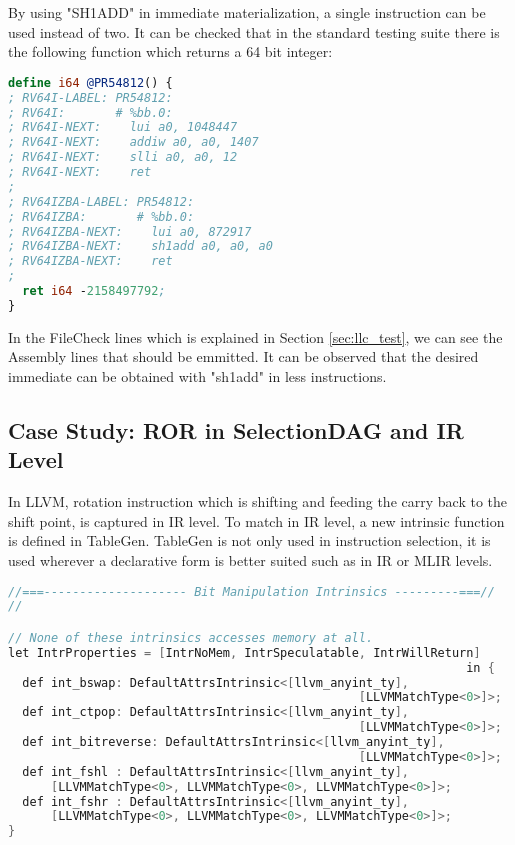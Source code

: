 By using "SH1ADD" in immediate materialization, a single instruction can be used instead of two. It can be checked that in the standard testing suite there is the following function which returns a 64 bit integer:
\begin{minipage}{\linewidth}
\begin{lstlisting}[language=llvm,style=nasm, caption={Function for Immediate Materialization}]
define i64 @PR54812() {
; RV64I-LABEL: PR54812:
; RV64I:       # %bb.0:
; RV64I-NEXT:    lui a0, 1048447
; RV64I-NEXT:    addiw a0, a0, 1407
; RV64I-NEXT:    slli a0, a0, 12
; RV64I-NEXT:    ret
;
; RV64IZBA-LABEL: PR54812:
; RV64IZBA:       # %bb.0:
; RV64IZBA-NEXT:    lui a0, 872917
; RV64IZBA-NEXT:    sh1add a0, a0, a0
; RV64IZBA-NEXT:    ret
;
  ret i64 -2158497792;
}
\end{lstlisting}
\end{minipage}
In the FileCheck lines which is explained in Section \ref{sec:llc_test}, we can see the Assembly lines that should be emmitted. It can be observed that the desired immediate can be obtained with "sh1add" in less instructions.

\subsection{Case Study: ROR in SelectionDAG and IR Level}

In LLVM, rotation instruction which is shifting and feeding the carry back to the shift point, is captured in IR level. To match in IR level, a new intrinsic function is defined in TableGen. TableGen is not only used in instruction selection, it is used wherever a declarative form is better suited such as in IR or MLIR levels.

\begin{lstlisting}[language=C++, caption={Funnel Shift Intrinsic Definition}]
//===-------------------- Bit Manipulation Intrinsics ---------===//
//

// None of these intrinsics accesses memory at all.
let IntrProperties = [IntrNoMem, IntrSpeculatable, IntrWillReturn]
                                                                in {
  def int_bswap: DefaultAttrsIntrinsic<[llvm_anyint_ty],
                                                 [LLVMMatchType<0>]>;
  def int_ctpop: DefaultAttrsIntrinsic<[llvm_anyint_ty],
                                                 [LLVMMatchType<0>]>;
  def int_bitreverse: DefaultAttrsIntrinsic<[llvm_anyint_ty],
                                                 [LLVMMatchType<0>]>;
  def int_fshl : DefaultAttrsIntrinsic<[llvm_anyint_ty],
      [LLVMMatchType<0>, LLVMMatchType<0>, LLVMMatchType<0>]>;
  def int_fshr : DefaultAttrsIntrinsic<[llvm_anyint_ty],
      [LLVMMatchType<0>, LLVMMatchType<0>, LLVMMatchType<0>]>;
}
\end{lstlisting}

